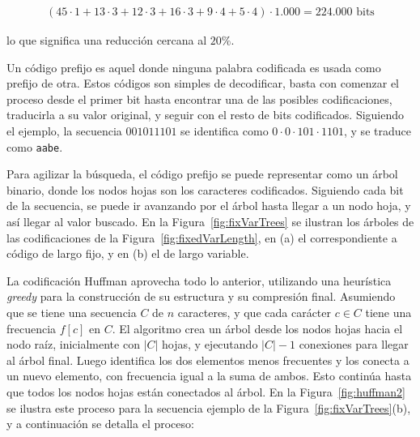 \begin{align*}
	(45 \cdot 1 + 13 \cdot 3 + 12 \cdot 3 + 16 \cdot 3 + 9 \cdot 4 + 5 \cdot 4) \cdot \textrm{1.000} = \textrm{224.000 bits}
\end{align*}

\noindent lo que significa una reducción cercana al $20\%$. 

Un código prefijo es aquel donde ninguna palabra codificada es usada como prefijo de otra. Estos códigos son simples de decodificar, basta con comenzar el proceso desde el primer bit hasta encontrar una de las posibles codificaciones, traducirla a su valor original, y seguir con el resto de bits codificados. Siguiendo el ejemplo, la secuencia $001011101$ se identifica como $0 \cdot 0 \cdot 101 \cdot 1101$, y se traduce como \texttt{aabe}.

Para agilizar la búsqueda, el código prefijo se puede representar como un árbol binario, donde los nodos hojas son los caracteres codificados. Siguiendo cada bit de la secuencia, se puede ir avanzando por el árbol hasta llegar a un nodo hoja, y así llegar al valor buscado. En la Figura~\ref{fig:fixVarTrees} se ilustran los árboles de las codificaciones de la Figura~\ref{fig:fixedVarLength}, en (a) el correspondiente a código de largo fijo, y en (b) el de largo variable.





La codificación Huffman aprovecha todo lo anterior, utilizando una heurística \textit{greedy} para la construcción de su estructura y su compresión final. Asumiendo que se tiene una secuencia $C$ de $n$ caracteres, y que cada carácter $c \in C$ tiene una frecuencia $f[c]$ en $C$. El algoritmo crea un árbol desde los nodos hojas hacia el nodo raíz, inicialmente con $|C|$ hojas, y ejecutando $|C| - 1$ conexiones para llegar al árbol final. Luego identifica los dos elementos menos frecuentes y los conecta a un nuevo elemento, con frecuencia igual a la suma de ambos. Esto continúa hasta que todos los nodos hojas están conectados al árbol. En la Figura~\ref{fig:huffman2} se ilustra este proceso para la secuencia ejemplo de la Figura~\ref{fig:fixVarTrees}(b), y a continuación se detalla el proceso:

